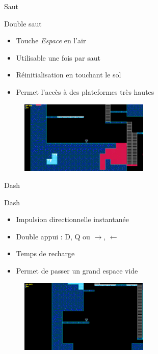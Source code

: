 \documentclass{beamer}
\begin{document}
{\begin{frame}{Saut}
    
    \begin{block}{Double saut}
        \begin{itemize}
            \item[\bullet] Touche \emph{Espace} en l'air
            \item[\bullet] Utilisable une fois par saut
            \item[\bullet] Réinitialisation en touchant le sol
            \item[\bullet] Permet l'accès à des plateformes très hautes
        \end{itemize}
    \end{block}
    \begin{figure}
        \centering
        \includegraphics[width=0.55\textwidth]{images/double_jump_ex.png}
    \end{figure}
\end{frame}

\begin{frame}{Dash}
    \begin{block}{Dash}
        \begin{itemize}
            \item[\bullet] Impulsion directionnelle instantanée
            \item[\bullet] Double appui : D, Q ou $\rightarrow$, $\leftarrow$
            \item[\bullet] Temps de recharge
            \item[\bullet] Permet de passer un grand espace vide
            
        \end{itemize}
    \end{block}
    \begin{figure}
        \centering
        \includegraphics[width=0.55\textwidth]{images/dash_ex.png}
    \end{figure}
\end{frame}

}
\end{document}

